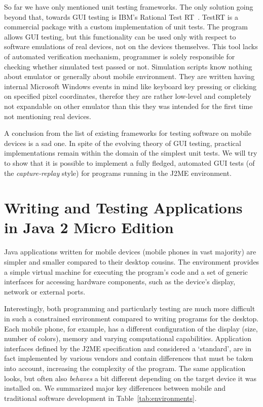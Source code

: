 \documentclass[a4paper,10pt,oneside,final]{dweiss-technote}
\renewcommand{\textsc}[1]{{\scriptsize \MakeUppercase{#1}}}
\newcommand{\jme}{\textsc{j2me}}
\begin{document}
So far we have only mentioned unit testing frameworks. The only solution going beyond that, towards
\textsc{gui} testing is IBM's Rational Test RT~\cite{rational}. TestRT is a commercial package with
a custom implementation of unit tests. The program allows \textsc{gui} testing, but this
functionality can be used only with respect to software emulations of real devices, not on the
devices themselves. This tool lacks of automated verification mechanism, programmer is solely
responsible for checking whether simulated test passed or not. Simulation scripts know nothing about
emulator or generally about mobile environment. They are written having internal Microsoft Windows
events in mind like keyboard key pressing or clicking on specified pixel coordinates, therefor they
are rather low-level and completely not expandable on other emulator than this they was intended for
the first time not mentioning real devices.

A conclusion from the list of existing frameworks for testing software on mobile devices is a sad one.
In spite of the evolving theory of \textsc{gui} testing, practical implementations remain within the
domain of the simplest unit tests. We will try to show that it is possible to implement
a fully fledged, automated \textsc{gui} tests (of the \emph{capture-replay} style) for programs running
in the \jme{} environment.


\section{Writing and Testing Applications in Java 2 Micro Edition}

Java applications written for mobile devices (mobile phones in vast majority) are simpler and
smaller compared to their desktop cousins. The environment provides a simple virtual machine for
executing the program's code and a set of generic interfaces for accessing hardware components, such
as the device's display, network or external ports.

Interestingly, both programming and particularly testing are much more difficult 
in such a constrained environment compared to writing programs for the desktop. Each mobile
phone, for example, has a different configuration of the display (size, number of colors), memory
and varying computational capabilities. Application interfaces defined by the J2ME specification
and considered a `standard', are in fact implemented by various vendors and contain differences
that must be taken into account, increasing the complexity of the program. The same application looks,
but often also \emph{behaves} a bit different depending on the target device it was installed on. 
We summarized major key differences between mobile and traditional software development in 
Table~\ref{tab:environments}.
\end{document}

